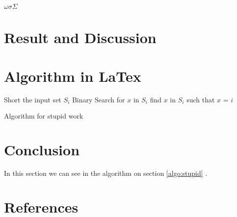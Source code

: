 \documentclass[conference]{IEEEtran}
\begin{document}
\bigskip

$ \omega  \sigma \Sigma $


\section{Result and Discussion}


\section{Algorithm in LaTex}
\begin{algorithm}
	\begin{algorithmic}
		\STATE Short the input set $S_i$
		\STATE Binary Search for $x$ in $S_i$
				\STATE find $x$ in $S_i$ such that $x$ = $i$
					\ENDIF
			\ENDFOR 
	\end{algorithmic}
	\caption{Algorithm for stupid work}
	\label{algo:stupid}
\end{algorithm}

\section{Conclusion}
In this section we can see in the algorithm on section \ref{algo:stupid} .

\section{References}



\end{document}
